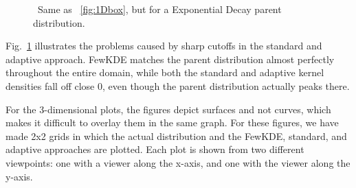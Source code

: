 \documentclass[prd,twocolumn]{revtex4}
\begin{document}
\begin{figure}[htp]
\caption{\ Same as ~\ref{fig:1Dbox}, but for a Exponential Decay parent distribution.}
\label{fig:1Dexp}
\end{figure}

Fig.~\ref{fig:1Dexp} illustrates the problems caused by sharp cutoffs in the standard and adaptive approach.  FewKDE matches the parent distribution almost perfectly throughout the entire domain, while both the standard and adaptive kernel densities fall off close 0, even though the parent distribution actually peaks there.

For the 3-dimensional plots, the figures depict surfaces and not curves, which makes it difficult to overlay them in the same graph.  For these figures, we have made 2x2 grids in which the actual distribution and the FewKDE, standard, and adaptive approaches are plotted.  Each plot is shown from two different viewpoints: one with a viewer along the x-axis, and one with the viewer along the y-axis.
\end{document}
